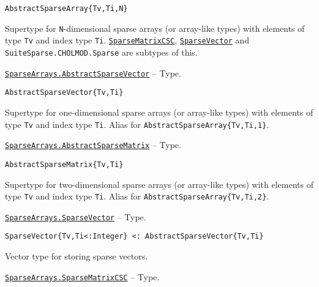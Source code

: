 \begin{adjustwidth}{2em}{0pt}


\begin{verbatim}
AbstractSparseArray{Tv,Ti,N}
\end{verbatim}

Supertype for \texttt{N}-dimensional sparse arrays (or array-like types) with elements of type \texttt{Tv} and index type \texttt{Ti}. \hyperlink{15099699527958384292}{\texttt{SparseMatrixCSC}}, \hyperlink{17594730109701296640}{\texttt{SparseVector}} and \texttt{SuiteSparse.CHOLMOD.Sparse} are subtypes of this.



\end{adjustwidth}
\hypertarget{7311510774978482969}{} 
\hyperlink{7311510774978482969}{\texttt{SparseArrays.AbstractSparseVector}}  -- {Type.}

\begin{adjustwidth}{2em}{0pt}


\begin{verbatim}
AbstractSparseVector{Tv,Ti}
\end{verbatim}

Supertype for one-dimensional sparse arrays (or array-like types) with elements of type \texttt{Tv} and index type \texttt{Ti}. Alias for \texttt{AbstractSparseArray\{Tv,Ti,1\}}.



\end{adjustwidth}
\hypertarget{7507379576530105001}{} 
\hyperlink{7507379576530105001}{\texttt{SparseArrays.AbstractSparseMatrix}}  -- {Type.}

\begin{adjustwidth}{2em}{0pt}


\begin{verbatim}
AbstractSparseMatrix{Tv,Ti}
\end{verbatim}

Supertype for two-dimensional sparse arrays (or array-like types) with elements of type \texttt{Tv} and index type \texttt{Ti}. Alias for \texttt{AbstractSparseArray\{Tv,Ti,2\}}.



\end{adjustwidth}
\hypertarget{17594730109701296640}{} 
\hyperlink{17594730109701296640}{\texttt{SparseArrays.SparseVector}}  -- {Type.}

\begin{adjustwidth}{2em}{0pt}


\begin{verbatim}
SparseVector{Tv,Ti<:Integer} <: AbstractSparseVector{Tv,Ti}
\end{verbatim}

Vector type for storing sparse vectors.



\end{adjustwidth}
\hypertarget{15099699527958384292}{} 
\hyperlink{15099699527958384292}{\texttt{SparseArrays.SparseMatrixCSC}}  -- {Type.}

